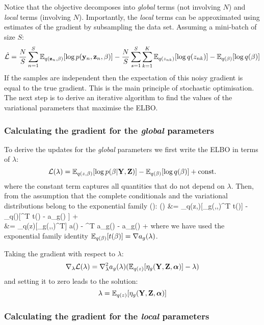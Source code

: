 Notice that the objective decomposes into \textit{global} terms (not involving $N$) and \textit{local} terms (involving $N$). Importantly, the \textit{local} terms can be approximated using estimates of the gradient by subsampling the data set. Assuming a mini-batch of size $S$:
\[
	\hat{\mathcal{L}} = \frac{N}{S} \sum_{n=1}^{S} \mathbb{E}_{q({\bf z}_n,\beta)}[\log p({\bf y}_n,{\bf z}_n,\beta)] - \frac{N}{S}\sum_{s=1}^{S} \sum_{k=1}^{K} \mathbb{E}_{q(z_{nk})}[\log q(z_{nk})] - \mathbb{E}_{q(\beta)}[\log q(\beta)]
\]
If the samples are independent then the expectation of this noisy gradient is equal to the true gradient. This is the main principle of stochastic optimisation. The next step is to derive an iterative algorithm to find the values of the variational parameters that maximise the ELBO.


\subsubsection{Calculating the gradient for the \textit{global} parameters}

To derive the updates for the \textit{global} parameters we first write the ELBO in terms of $\lambda$:
\[
	\mathcal{L}(\lambda) = \mathbb{E}_{q(z,\beta)}[\log p(\beta|{\bf Y},{\bf Z})] - \mathbb{E}_{q(\beta)}[\log q(\beta)] + {\rm const.}
\]
where the constant term captures all quantities that do not depend on $\lambda$. Then, from the assumption that the complete conditionals and the variational distributions belong to the exponential family ():
\baln
	\Lagr(\lambda) &= \E_{q(z,\beta)}[\eta_g(\bfY,\bfZ,\balpha)^T t(\beta)] - \E_{q(\beta)}[\lambda^T t(\beta) - a_g(\lambda) ] + \const \\
	&= \E_{q(z)}[\eta_g(\bfY,\bfZ,\balpha)^T] \nabla a(\lambda) - \lambda^T \nabla a_g(\lambda) - a_g(\lambda) + \const
\ealn
where we have used the exponential family identity $\mathbb{E}_{q(\beta)}[t(\beta)] = \nabla a_g(\lambda)$.

Taking the gradient with respect to $\lambda$:
\begin{equation} \label{gradient_global}
	\nabla_{\lambda} \mathcal{L}(\lambda) = \nabla_{\lambda}^{2} a_g(\lambda)(\mathbb{E}_{q(z)}[\eta_g({\bf Y},{\bf Z},\mbox{\boldmath $\alpha$})] - \lambda)
\end{equation}
and setting it to zero leads to the solution:
\begin{equation} \label{solution_global}
	\lambda = \mathbb{E}_{q(z)}[\eta_g({\bf Y},{\bf Z},\mbox{\boldmath $\alpha$})]
\end{equation}


\subsubsection{Calculating the gradient for the \textit{local} parameters}


